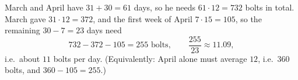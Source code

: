 March and April have $31+30=61$ days, so he needs $61\cdot12=732$ bolts in total. March gave $31\cdot12=372$, and the first week of April $7\cdot15=105$, so the remaining $30-7=23$ days need
\[
732-372-105=255\text{ bolts},\qquad\dfrac{255}{23}\approx11.09 ,
\]
i.e.\ about $\boxed{11}$ bolts per day. (Equivalently: April alone must average $12$, i.e.\ $360$ bolts, and $360-105=255$.)

